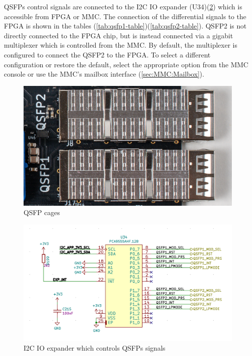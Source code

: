 \documentclass[12pt,oneside,a4]{article}
\begin{document}
QSFPs control signals are connected to the I2C IO expander (U34)(\ref{qsfpio}) which is accessible from FPGA or MMC.
The connection of the differential signals to the FPGA is shown in the tables (\ref{tab:qsfp1-table})(\ref{tab:qsfp2-table}).
QSFP2 is not directly connected to the FPGA chip, but is instead connected via a gigabit multiplexer which is controlled from the MMC.
By default, the multiplexer is configured to connect the QSFP2 to the FPGA.
To select a different configuration or restore the default, select the appropriate option from the MMC console or use the MMC's mailbox interface (\ref{sec:MMC:Mailbox}).

\begin{figure}[H]
\begin{center}
\includegraphics[width=0.8\linewidth]{qsfp.png}
 \caption{QSFP cages}\label{qsfp}
\end{center}
\end{figure}

\begin{figure}[H]
\begin{center}
\includegraphics[width=0.8\linewidth]{qsfpio.png}
 \caption{I2C IO expander which controls QSFPs signals}\label{qsfpio}
\end{center}
\end{figure}
\end{document}
